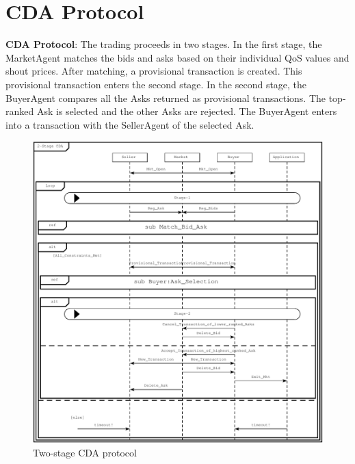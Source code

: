 \documentclass[10pt,journal,compsoc]{IEEEtran}
\begin{document}
\section{CDA Protocol}
\textbf{CDA Protocol}: The trading proceeds in two stages. In the first stage, the MarketAgent matches the bids and asks based on their individual QoS values and shout prices. After matching, a provisional transaction is created. This provisional transaction enters the second stage. In the second stage, the BuyerAgent compares all the Asks returned as provisional transactions. The top-ranked Ask is selected and the other Asks are rejected. The BuyerAgent enters into a transaction with the SellerAgent of the selected Ask.

\begin{figure}[h]
\centering
\includegraphics[scale=0.7]{drawings/cda_protocol.pdf}
\caption{Two-stage CDA protocol \label{fig:cda_protocol}}
\end{figure}
\end{document}
